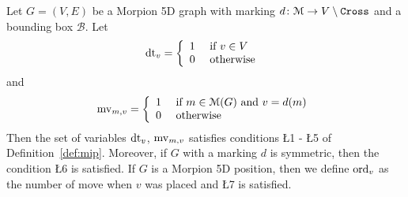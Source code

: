 \begin{lemma}
  \label{lem:graphs}
  Let $G = (V, E)$ be a Morpion 5D graph with marking $d \colon \mathcal{M} \to V \setminus \texttt{Cross}$
  and a bounding box $\mathcal{B}$.
  Let
  \[
    \operatorname{dt}_v = 
    \left\{
    \begin{array}{ll}
      1 & \text{ if } v \in V \\
      0 & \text{ otherwise }
    \end{array}
    \right.
  \]
  and 
  \[
    \operatorname{mv}_{m, v} = 
    \left\{
    \begin{array}{ll}
      1 & \text{ if } m \in \mathcal{M}(G) \text{ and } v = d(m) \\
      0 & \text{ otherwise }
    \end{array}
    \right.
  \]
  Then the set of variables $\operatorname{dt}_v$, $\operatorname{mv}_{m, v}$ satisfies conditions \L{1} - \L{5} of Definition~\ref{def:mip}.
  Moreover, if $G$ with a marking $d$ is symmetric, then the condition \L{6} is satisfied. If $G$ is a Morpion 5D position, then
we define $\operatorname{ord}_v$ as the number of move when $v$ was placed and \L{7} is satisfied.   
\end{lemma}
